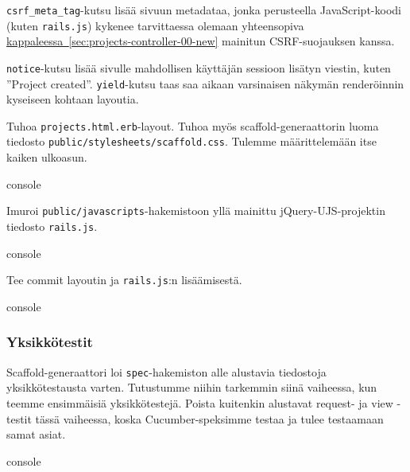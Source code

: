 \documentclass{article}
\newcommand{\myref}[2]{\hyperref[#2]{#1~\ref*{#2}}}
\newcommand{\pdfforeignlanguage}[2]{\texorpdfstring{\foreignlanguage{#1}{#2}}{#2}}
\newcommand{\eng}[1]{\pdfforeignlanguage{english}{#1}}
\begin{document}
\texttt{csrf\_meta\_tag}-kutsu lisää sivuun metadataa, jonka perusteella
JavaScript-koodi (kuten \texttt{rails.js}) kykenee tarvittaessa olemaan
yhteensopiva \myref{kappaleessa}{sec:projects-controller-00-new} mainitun
CSRF-suojauksen kanssa.

\texttt{notice}-kutsu lisää sivulle mahdollisen käyttäjän sessioon lisätyn
viestin, kuten ''Project created''. \texttt{yield}-kutsu taas saa aikaan
varsinaisen näkymän renderöinnin kyseiseen kohtaan layoutia.

\begin{samepage}
Tuhoa \texttt{projects.html.erb}-layout. Tuhoa myös
\eng{scaffold}-generaattorin luoma tiedosto
\texttt{public/stylesheets/scaffold.css}. Tulemme määrittelemään itse kaiken
ulkoasun.

\begin{pygmented}{console}
\end{pygmented}
\end{samepage}

\begin{samepage}
Imuroi \texttt{public/javascripts}-hakemistoon yllä mainittu
jQuery-UJS-projektin tiedosto \texttt{rails.js}.

\begin{pygmented}{console}
\end{pygmented}
\end{samepage}

\begin{samepage}
Tee commit layoutin ja \texttt{rails.js}:n lisäämisestä.

\begin{pygmented}{console}
\end{pygmented}
\end{samepage}

\subsubsection{Yksikkötestit}

\begin{samepage}
\eng{Scaffold}-generaattori loi \texttt{spec}-hakemiston alle alustavia
tiedostoja yksikkötestausta varten. Tutustumme niihin tarkemmin siinä
vaiheessa, kun teemme ensimmäisiä yksikkötestejä. Poista kuitenkin alustavat
\eng{request}- ja \eng{view} -testit tässä vaiheessa, koska Cucumber-speksimme
testaa ja tulee testaamaan samat asiat.

\begin{pygmented}{console}
\end{pygmented}
\end{samepage}
\end{document}
